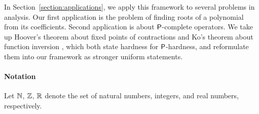 \documentclass[envcountsame,orivec,oribibl]{llncs}
\begin{document}
In Section~\ref{section:applications}, 
we apply this framework to several problems in analysis.
Our first application is the problem of finding roots of a polynomial 
from its coefficients.
Second application is about $\mathsf{P}$-complete operators.
We take up
Hoover's theorem about fixed points of contractions \cite{hoover1991real}
and Ko's theorem about function inversion \cite{ko1991complexity}, 
which both state hardness for $\mathsf{P}$-hardness, 
and reformulate them into our framework
as stronger uniform statements.




\paragraph{Notation}
Let $\mathbb N$, $\mathbb Z$, $\mathbb R$ denote the set of natural numbers, integers, and 
real numbers, respectively.
\end{document}
